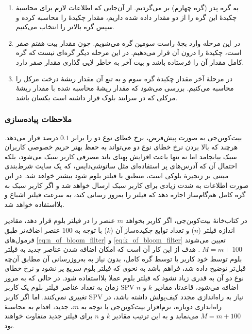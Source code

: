 \begin{enumerate}
	\item{%
	به گره پدر (گره چهارم) بر می‌گردیم. از آن‌جایی که اطلاعات لازم برای محاسبهٔ چکیدهٔ این گره را از دو مقدار   داده شده داریم، مقدار چکیدهٔ را محاسبه کرده و سپس گره بالاتر را انتخاب می‌کنیم. 
}
	\item{%
	در این مرحله وارد بچهٔ راست سومین گره می‌شویم. چون مقدار بیت هفتم  صفر است، چکیدهٔ  را درون آن قرار می‌دهیم. در این مرحله دیگر گره‌ای نیست که گره کامل مقدار آن را فرستاده باشد و بیت آخر  به خاطر لایی گذاری مقدار صفر دارد. 
}
	\item{%
	در مرحلهٔ آخر مقدار چکیدهٔ گره سوم و به تبع آن مقدار ریشهٔ درخت مرکل را محاسبه می‌کنیم. بررسی می‌شود که مقدار ریشهٔ محاسبه شده با مقدار ریشهٔ مرکلی که در سرایند بلوک قرار داشته است یکسان باشد.
}
\end{enumerate}


\subsubsection{ملاحظات پیاده‌سازی}
بیت‌کوین‌جی\cite{bitcoinj} به صورت پیش‌فرض، نرخ خطای نوع دو را برابر $0.1$ درصد قرار می‌دهد. هرچند که بالا بردن نرخ خطای نوع دو می‌تواند به حفظ بهتر حریم خصوصی کاربران سبک بیانجامد اما نه تنها باعث افزایش پهنای باند مصرفی کاربر سبک می‌شود، بلکه احتمال آن که آدرس‌های پر استفاده‌ای مثل 
ساتوشی‌دایس،
که یک سایت شرط‌بندی مبتنی بر زنجیرهٔ بلوکی است، منطبق با فیلتر بلوم شود بیشتر خواهد شد. در این صورت اطلاعات به شدت زیادی برای کاربر سبک ارسال خواهد شد و اگر کاربر سبک به گره کامل هم‌گام‌ساز اجازه دهد که فیلتر را به‌روز رسانی کند، به سرعت فیلتر اشباع و بلااستفاده خواهد شد.
 
در کتاب‌خانهٔ بیت‌کوین‌جی، اگر کاربر بخواهد $m$ عنصر را در فیلتر بلوم قرار دهد، مقادیر اندازه فیلتر ($n$) و تعداد توابع چکیده‌ساز آن ($k$) با توجه به $100$ عنصر اضافه‌تر طبق فرمول‌های \eqref{eq:n_of_bloom_filter} و \eqref{eq:k_of_bloom_filter} تعیین می‌شوند 
$M=m+100$ \cite{Gervais2014}.
 هدف از این کار آن است که امکان اضافه شدن عناصر جدید به فیلتر بلوم توسط خود کاربر یا توسط گره کامل، بدون نیاز به به‌روزرسانی آن مطابق آن‌چه قبل‌تر توضیح داده شد، فراهم باشد به نحوی که فیلتر بلوم سریع پر نشود و نرخ خطای نوع دو آن به قدری زیاد نشود که فیلتر بلوم عملا بلااستفاده شود. در حالی که به مرور زمان به تعداد عناصر فیلتر بلوم یک کاربر SPV اضافه می‌شود، قاعدتا، مقادیر $k$ و $n$ تغییری نمی‌کنند. اما اگر کاربر SPV نیاز به راه‌اندازی مجدد کیف‌پولش داشته باشد، در راه‌اندازی دوباره، نرم‌افزار بیت‌کوین‌جی با توجه به $m$، جدید، اقدام به محاسبهٔ $M=m+100$ می‌نماید و به این ترتیب مقادیر  $k$ و $n$ برای فیلتر جدید متفاوت خواهند بود.
 
